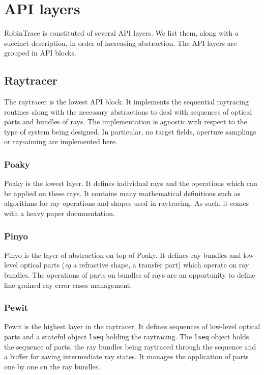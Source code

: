 \section{API layers}
RobinTrace is constituted of several API layers. We list them, along with a
succinct description, in order of increasing abstraction. The API layers are
grouped in API blocks.

\subsection{Raytracer}
The raytracer is the lowest API block. It implements the sequential raytracing
routines along with the necessary abstractions to deal with sequences of optical
parts and bundles of rays. The implementation is agnostic with respect to the
type of system being designed. In particular, no target fields, aperture
samplings or ray-aiming are implemented here.

\subsubsection{Poaky}
Poaky is the lowest layer. It defines individual rays and the operations which
can be applied on these rays. It contains many mathematical definitions
such as algorithms for ray operations and shapes used in raytracing. As such,
it comes with a heavy paper documentation.

\subsubsection{Pinyo}
Pinyo is the layer of abstraction on top of Poaky. It defines ray bundles and
low-level optical parts (\textit{eg} a refractive shape, a transfer part) which
operate on ray bundles. The operations of parts on bundles of rays are an
opportunity to define fine-grained ray error cases management.

\subsubsection{Pewit}
Pewit is the highest layer in the raytracer. It defines sequences of low-level
optical parts and a stateful object \lstinline{lseq} holding the raytracing. The
\lstinline{lseq} object holds the sequence of parts, the ray bundles being
raytraced through the sequence and a buffer for saving intermediate ray states.
It manages the application of parts one by one on the ray bundles.
